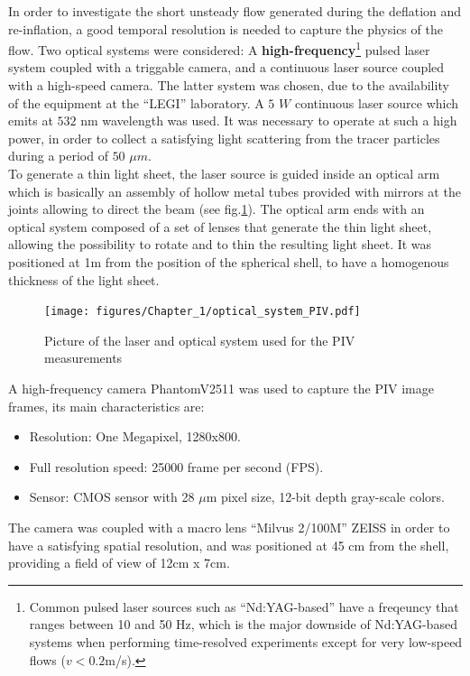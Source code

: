 In order to investigate the short unsteady flow generated during the deflation and re-inflation, a good temporal resolution is needed to capture the physics of the flow. Two optical systems were considered: A \textbf{high-frequency}\footnote{Common pulsed laser sources such as "`Nd:YAG-based"' have a freqeuncy that ranges between 10 and 50 Hz, which is the major downside of Nd:YAG-based systems when performing time-resolved experiments except for very low-speed flows ($v < 0.2$m/s)\cite{PIV_springer}.} pulsed laser system coupled with a triggable camera, and a continuous laser source coupled with a high-speed camera. The latter system was chosen, due to the availability of the equipment at the "`LEGI"' laboratory.
A $5$ $W$ continuous laser source which emits at $532$ nm wavelength was used. It was necessary to operate at such a high power, in order to collect a satisfying light scattering from the tracer particles during a period of $50$ $\mu m$.\\
To generate a thin light sheet, the laser source is guided inside an optical arm which is basically an assembly of hollow metal tubes provided with mirrors at the joints allowing to direct the beam (see fig.\ref{fig:optical_system_PIV}). The optical arm ends with an optical system composed of a set of lenses that generate the thin light sheet, allowing the possibility to rotate and to thin the resulting light sheet. It was positioned at 1m from the position of the spherical shell, to have a homogenous thickness of the light sheet.\\ 
\begin{figure}[H]%
	\centering%
	\texttt{[image: figures/Chapter\_1/optical\_system\_PIV.pdf]}
	\caption{Picture of the laser and optical system used for the PIV measurements}
	\label{fig:optical_system_PIV}
\end{figure}
A high-frequency camera Phantom\textcopyright V2511 was used to capture the PIV image frames, its main characteristics are:
\begin{itemize}
	\item Resolution: One Megapixel, 1280x800.
	\item Full resolution speed: 25000 frame per second (FPS).
	\item Sensor: CMOS sensor with 28 $\mu$m pixel size, 12-bit depth gray-scale colors.
\end{itemize}
The camera was coupled with a macro lens "`Milvus 2/100M"' ZEISS in order to have a satisfying spatial resolution, and was positioned at 45 cm from the shell, providing a field of view of 12cm x 7cm.

